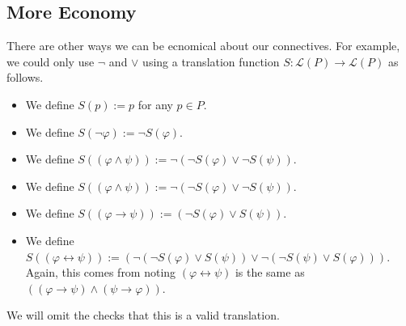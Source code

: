 \subsection{More Economy}
There are other ways we can be ecnomical about our connectives. For example, we could only use $\lnot$ and $\lor$ using a translation function $S:\mathcal L(P)\to\mathcal L(P)$ as follows.
\begin{itemize}
	\item We define $S(p):=p$ for any $p\in P$.
	\item We define $S(\lnot\varphi):=\lnot S(\varphi)$.
	\item We define $S((\varphi\land\psi)):=\lnot(\lnot S(\varphi)\lor\lnot S(\psi))$.
	\item We define $S((\varphi\land\psi)):=\lnot(\lnot S(\varphi)\lor\lnot S(\psi))$.
	\item We define $S((\varphi\to\psi)):=(\lnot S(\varphi)\lor S(\psi))$.
	\item We define $S((\varphi\leftrightarrow\psi)):=(\lnot(\lnot S(\varphi)\lor S(\psi))\lor\lnot(\lnot S(\psi)\lor S(\varphi)))$. Again, this comes from noting $(\varphi\leftrightarrow\psi)$ is the same as $((\varphi\to\psi)\land(\psi\to\varphi))$.
\end{itemize}
We will omit the checks that this is a valid translation.